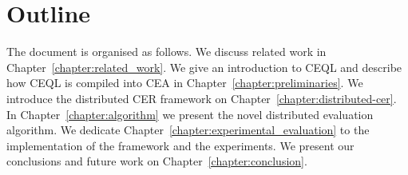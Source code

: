 \section{Outline}
\label{sec:outline}

The document is organised as follows. We discuss related work in Chapter~\ref{chapter:related_work}. We give an introduction to CEQL and describe how CEQL is compiled into CEA in Chapter~\ref{chapter:preliminaries}. We introduce the distributed CER framework on Chapter~\ref{chapter:distributed-cer}. In Chapter~\ref{chapter:algorithm} we present the novel distributed evaluation algorithm. We dedicate Chapter~\ref{chapter:experimental_evaluation} to the implementation of the framework and the experiments. We present our conclusions and future work on Chapter~\ref{chapter:conclusion}.
